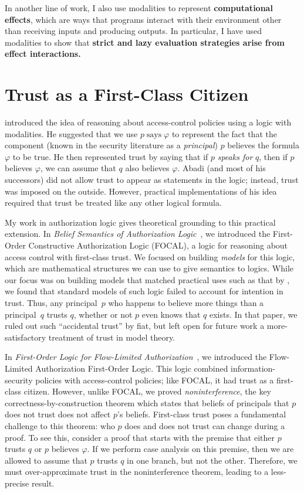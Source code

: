 \documentclass{article}
\theoremstyle{definition}
\begin{document}
In another line of work, I also use modalities to represent \textbf{computational effects}, which are ways that programs interact with their environment other than receiving inputs and producing outputs.
In particular, I have used modalities to show that \textbf{strict and lazy evaluation strategies arise from effect interactions.}

\section*{Trust as a First-Class Citizen}
\citet{Abadi06} introduced the idea of reasoning about access-control policies using a logic with modalities.
He suggested that we use $p \mathrel{\textrm{says}} \varphi$ to represent the fact that the component (known in the security literature as a \emph{principal}) $p$ believes the formula $\varphi$ to be true.
He then represented trust by saying that if $p$ \emph{speaks for} $q$, then if $p$ believes $\varphi$, we can assume that $q$ also believes $\varphi$.
Abadi (and most of his successors) did not allow trust to appear as statements in the logic; instead, trust was imposed on the outside.
However, practical implementations of his idea~\citep{SchneiderWS11,SirerDBRSWWS11} required that trust be treated like any other logical formula.

My work in authorization logic gives theoretical grounding to this practical extension.
In \textit{Belief Semantics of Authorization Logic}~\citet{HirschC13}, we introduced the First-Order Constructive Authorization Logic (FOCAL), a logic for reasoning about access control with first-class trust.
We focused on building \emph{models} for this logic, which are mathematical structures we can use to give semantics to logics.
While our focus was on building models that matched practical uses such as that by \citet{SirerDBRSWWS11}, we found that standard models of such logic failed to account for intention in trust.
Thus, any principal~$p$ who happens to believe more things than a principal~$q$ trusts $q$, whether or not $p$ even knows that $q$ exists.
In that paper, we ruled out such ``accidental trust'' by fiat, but left open for future work a more-satisfactory treatment of trust in model theory.

In \textit{First-Order Logic for Flow-Limited Authorization}~\citep{HirschACAT20}, we introduced the Flow-Limited Authorization First-Order Logic.
This logic combined information-security policies with access-control policies; like FOCAL, it had trust as a first-class citizen.
However, unlike FOCAL, we proved \emph{noninterference}, the key correctness-by-construction theorem which states that beliefs of principals that $p$ does not trust does not affect $p$'s beliefs.
First-class trust poses a fundamental challenge to this theorem: who $p$ does and does not trust can change during a proof.
To see this, consider a proof that starts with the premise that either $p$ trusts $q$ or $p$ believes $\varphi$.
If we perform case analysis on this premise, then we are allowed to assume that $p$ trusts $q$ in one branch, but not the other.
Therefore, we must over-approximate trust in the noninterference theorem, leading to a less-precise result.
\end{document}
